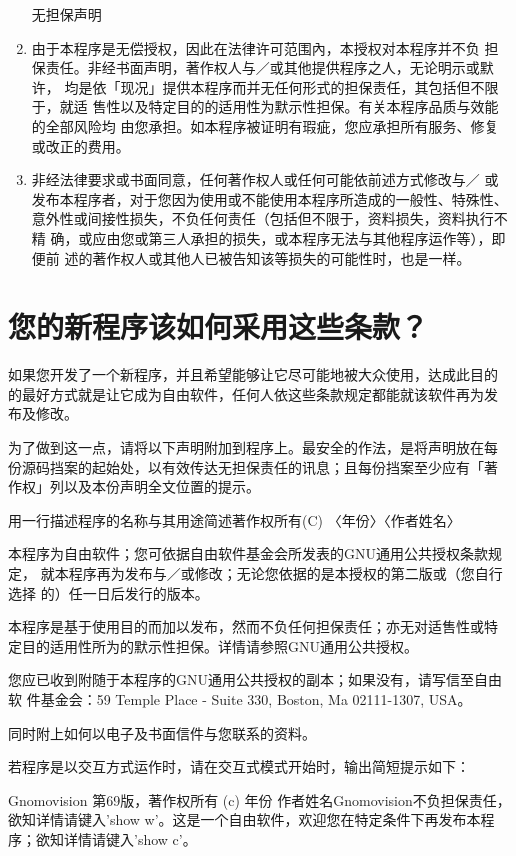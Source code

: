 \begin{enumerate}
无担保声明

\item 由于本程序是无偿授权，因此在法律许可范围內，本授权对本程序并不负
担保责任。非经书面声明，著作权人与／或其他提供程序之人，无论明示或默许，
均是依「现况」提供本程序而并无任何形式的担保责任，其包括但不限于，就适
售性以及特定目的的适用性为默示性担保。有关本程序品质与效能的全部风险均
由您承担。如本程序被证明有瑕疵，您应承担所有服务、修复或改正的费用。

\item 非经法律要求或书面同意，任何著作权人或任何可能依前述方式修改与／
或发布本程序者，对于您因为使用或不能使用本程序所造成的一般性、特殊性、
意外性或间接性损失，不负任何责任（包括但不限于，资料损失，资料执行不精
确，或应由您或第三人承担的损失，或本程序无法与其他程序运作等），即便前
述的著作权人或其他人已被告知该等损失的可能性时，也是一样。
\end{enumerate}

\section{您的新程序该如何采用这些条款？}
\label{sec:app:GPL:howToUse}
如果您开发了一个新程序，并且希望能够让它尽可能地被大众使用，达成此目的
的最好方式就是让它成为自由软件，任何人依这些条款规定都能就该软件再为发
布及修改。

为了做到这一点，请将以下声明附加到程序上。最安全的作法，是将声明放在每
份源码挡案的起始处，以有效传达无担保责任的讯息；且每份挡案至少应有「著
作权」列以及本份声明全文位置的提示。

用一行描述程序的名称与其用途简述著作权所有(C) 〈年份〉〈作者姓名〉

本程序为自由软件；您可依据自由软件基金会所发表的GNU通用公共授权条款规定，
就本程序再为发布与／或修改；无论您依据的是本授权的第二版或（您自行选择
的）任一日后发行的版本。

本程序是基于使用目的而加以发布，然而不负任何担保责任；亦无对适售性或特
定目的适用性所为的默示性担保。详情请参照GNU通用公共授权。

您应已收到附随于本程序的GNU通用公共授权的副本；如果没有，请写信至自由软
件基金会：59 Temple Place - Suite 330, Boston, Ma 02111-1307, USA。

同时附上如何以电子及书面信件与您联系的资料。

若程序是以交互方式运作时，请在交互式模式开始时，输出简短提示如下：

Gnomovision 第69版，著作权所有 (c) 年份 作者姓名Gnomovision不负担保责任，
欲知详情请键入'show w'。这是一个自由软件，欢迎您在特定条件下再发布本程
序；欲知详情请键入'show c'。

